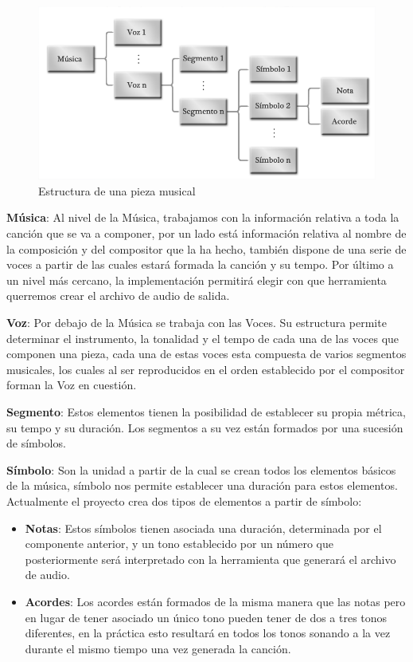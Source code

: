 	\begin{figure}[htbp]
	\centering
	\hspace*{-0.1in}
	\includegraphics[scale=0.47]{graphics/musica-estructura.png}
	\caption{\color{blue}Estructura de una pieza musical\color{black}}
	\label{fig:structmusic}
	\end{figure}


\textbf{Música}: Al nivel de la Música, trabajamos con la información relativa a toda la canción que se va a componer, por un lado está información relativa al nombre de la composición y del compositor que la ha hecho, también dispone de una serie de voces a partir de las cuales estará formada la canción y su tempo. Por último a un nivel más cercano, la implementación permitirá elegir con que herramienta querremos crear el archivo de audio de salida.
\newline

\textbf{Voz}: Por debajo de la Música se trabaja con las Voces. Su estructura permite determinar el instrumento, la tonalidad y\color{blue} el tempo de cada una de las voces que componen una pieza\color{black}, cada una de estas voces esta compuesta de varios segmentos musicales, los cuales al ser reproducidos en el orden establecido por el compositor forman la Voz en cuestión.
\newline

\textbf{Segmento}: Estos elementos tienen la posibilidad de establecer su propia métrica, su tempo y su duración. Los segmentos a su vez están formados por una sucesión de símbolos.
\newline

\textbf{Símbolo}: Son la unidad a partir\color{blue} de la cual \color{black}se crean todos los elementos básicos de la música, símbolo nos permite establecer una duración para estos elementos. Actualmente el proyecto crea dos tipos de elementos a partir de símbolo:
\begin{itemize}
\item \textbf{Notas}: Estos símbolos tienen asociada una duración, determinada por el componente anterior, y un tono establecido por un número que posteriormente será interpretado con la herramienta que generará el archivo de audio.
\item \textbf{Acordes}: Los acordes están formados de la misma manera que las notas pero en lugar de tener asociado un único tono pueden tener de dos a tres tonos diferentes, en la práctica esto resultará en todos los tonos sonando a la vez durante el mismo tiempo una vez generada la canción.
\end{itemize}
 
